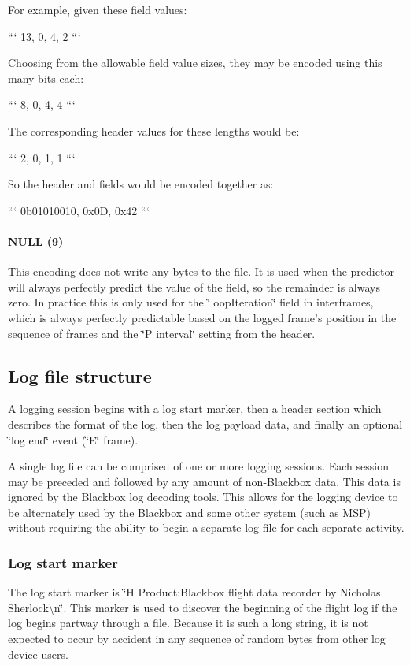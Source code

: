 For example, given these field values\+:

``` 13, 0, 4, 2 ```

Choosing from the allowable field value sizes, they may be encoded using this many bits each\+:

``` 8, 0, 4, 4 ```

The corresponding header values for these lengths would be\+:

``` 2, 0, 1, 1 ```

So the header and fields would be encoded together as\+:

``` 0b01010010, 0x0\+D, 0x42 ```

\paragraph*{N\+U\+L\+L (9)}

This encoding does not write any bytes to the file. It is used when the predictor will always perfectly predict the value of the field, so the remainder is always zero. In practice this is only used for the \char`\"{}loop\+Iteration\char`\"{} field in interframes, which is always perfectly predictable based on the logged frame's position in the sequence of frames and the \char`\"{}\+P interval\char`\"{} setting from the header.

\subsection*{Log file structure}

A logging session begins with a log start marker, then a header section which describes the format of the log, then the log payload data, and finally an optional \char`\"{}log end\char`\"{} event (\char`\"{}\+E\char`\"{} frame).

A single log file can be comprised of one or more logging sessions. Each session may be preceded and followed by any amount of non-\/\+Blackbox data. This data is ignored by the Blackbox log decoding tools. This allows for the logging device to be alternately used by the Blackbox and some other system (such as M\+S\+P) without requiring the ability to begin a separate log file for each separate activity.

\subsubsection*{Log start marker}

The log start marker is \char`\"{}\+H Product\+:\+Blackbox flight data recorder by Nicholas Sherlock\textbackslash{}n\char`\"{}. This marker is used to discover the beginning of the flight log if the log begins partway through a file. Because it is such a long string, it is not expected to occur by accident in any sequence of random bytes from other log device users.

